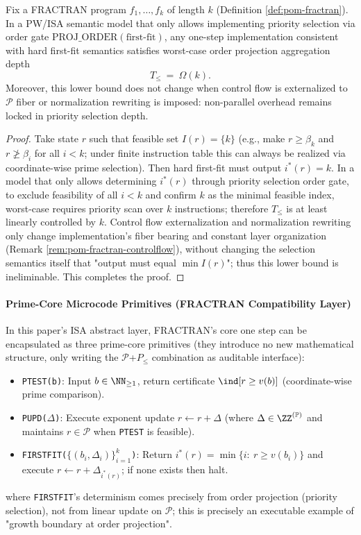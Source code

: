 \begin{proposition}\label{prop:pom-fractran-firstfit-serial-depth}
Fix a FRACTRAN program \(f_1,\dots,f_k\) of length \(k\) (Definition \ref{def:pom-fractran}).
In a PW/ISA semantic model that only allows implementing priority selection via order gate \(\mathrm{PROJ\_ORDER}(\text{first-fit})\), any one-step implementation consistent with hard first-fit semantics satisfies worst-case order projection aggregation depth
\[
T_{\le}\ =\ \Omega(k).
\]
Moreover, this lower bound does not change when control flow is externalized to \(\mathcal{P}\) fiber or normalization rewriting is imposed: non-parallel overhead remains locked in priority selection depth.
\end{proposition}
\begin{proof}
Take state \(r\) such that feasible set \(I(r)=\{k\}\) (e.g., make \(r\ge \beta_k\) and \(r\not\ge \beta_i\) for all \(i<k\); under finite instruction table this can always be realized via coordinate-wise prime selection).
Then hard first-fit must output \(i^\ast(r)=k\).
In a model that only allows determining \(i^\ast(r)\) through priority selection order gate, to exclude feasibility of all \(i<k\) and confirm \(k\) as the minimal feasible index, worst-case requires priority scan over \(k\) instructions; therefore \(T_{\le}\) is at least linearly controlled by \(k\).
Control flow externalization and normalization rewriting only change implementation's fiber bearing and constant layer organization (Remark \ref{rem:pom-fractran-controlflow}), without changing the selection semantics itself that "output must equal \(\min I(r)\)"; thus this lower bound is ineliminable. This completes the proof.
\end{proof}

\paragraph{Prime-Core Microcode Primitives (FRACTRAN Compatibility Layer)}
In this paper's ISA abstract layer, FRACTRAN's core one step can be encapsulated as three prime-core primitives (they introduce no new mathematical structure, only writing the \(\mathcal{P}\)+\(P_{\le}\) combination as auditable interface):
\begin{itemize}
  \item \texttt{PTEST(b)}: Input \(b\in\NN_{\ge 1}\), return certificate \(\ind\!\left[r\ge v(b)\right]\) (coordinate-wise prime comparison).
  \item \texttt{PUPD($\Delta$)}: Execute exponent update \(r\leftarrow r+\Delta\) (where \(\Delta\in\ZZ^{(\mathbb{P})}\) and maintains \(r\in\mathcal{P}\) when \texttt{PTEST} is feasible).
  \item \texttt{FIRSTFIT($\{(b_i,\Delta_i)\}_{i=1}^k$)}: Return \(i^\ast(r)=\min\{i:\ r\ge v(b_i)\}\) and execute \(r\leftarrow r+\Delta_{i^\ast(r)}\); if none exists then halt.
\end{itemize}
where \texttt{FIRSTFIT}'s determinism comes precisely from order projection (priority selection), not from linear update on \(\mathcal{P}\); this is precisely an executable example of "growth boundary at order projection".

